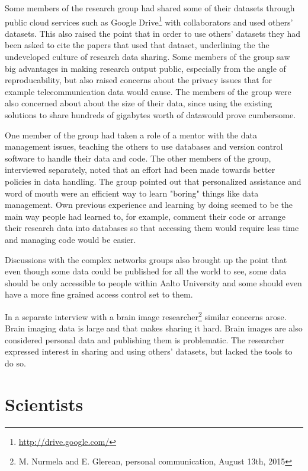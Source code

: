 Some members of the research group had shared some of their datasets through
public cloud services such as Google Drive\footnote{\url{http://drive.google.com/}}
with collaborators and used others' datasets. This also raised the point that
in order to use others' datasets they had been asked to cite the papers that
used that dataset, underlining the the undeveloped culture of research data
sharing. Some members of the group saw big advantages in making research output
public, especially from the angle of reproducability, but also raised concerns
about the privacy issues that for example telecommunication data would cause.
The members of the group were also concerned about about the size of their
data, since using the existing solutions to share hundreds of gigabytes worth
of datawould prove cumbersome.

One member of the group had taken a role of a mentor with the data management
issues, teaching the others to use databases and version control software to
handle their data and code. The other members of the group, interviewed
separately, noted that an effort had been made towards better policies in data
handling. The group pointed out that personalized assistance and word of mouth
were an efficient way to learn "boring" things like data management. Own
previous experience and learning by doing seemed to be the main way people had
learned to, for example, comment their code or arrange their research data into
databases so that accessing them would require less time and managing code
would be easier.

Discussions with the complex networks groups also brought up the point that
even though some data could be published for all the world to see, some data
should be only accessible to people within Aalto University and some should
even have a more fine grained access control set to them.

In a separate interview with a brain image researcher\footnote{M. Nurmela and
E. Glerean, personal communication, August 13th, 2015} similar concerns arose.
Brain imaging data is large and that makes sharing it hard. Brain images are
also considered personal data and publishing them is problematic. The
researcher expressed interest in sharing and using others' datasets, but
lacked the tools to do so.

\iffalse
\section{Scientists}


